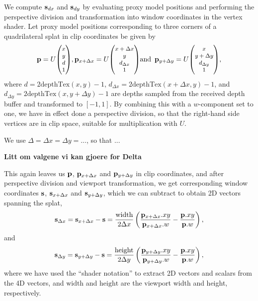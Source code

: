 We compute $\mathbf{s}_{dx}$ and $\mathbf{s}_{dy}$ by evaluating proxy model positions and
performing the perspective division and transformation into window coordinates
in the vertex shader. Let proxy model positions corresponding to three corners
of a quadrilateral splat in clip coordinates be
given by
\[
  \pv =
  U { \small \begin{pmatrix} x \\ y \\ d \\ 1 \end{pmatrix} },
  \pv_{x+\Delta x} =
  U { \small \begin{pmatrix} x+\Delta x \\ y \\ d_{\Delta x} \\ 1 \end{pmatrix} }
  \text{and}\, \, \, 
  \pv_{y+\Delta y} =
  U { \small \begin{pmatrix} x \\ y+\Delta y \\ d_{\Delta y} \\ 1 \end{pmatrix} },
\]
where $d = 2\text{depthTex}(x, y) - 1$, $d_{\Delta x} =
2\text{depthTex}(x+\Delta x, y) - 1$, and $d_{\Delta y} = 2\text{depthTex}(x,
y+\Delta y) - 1$ are depths sampled from the received depth buffer and
transformed to $[-1, 1]$. By combining this with a $w$-component set to one, we
have in effect done a perspective division, so that the right-hand side vertices
are in clip space, suitable for multiplication with $U$.

We use $\Delta = \Delta x = \Delta y = ...$, so that ...

\textbf{ Litt om valgene vi kan gjoere for Delta}

This again leaves us $\mathbf{p}$, $\mathbf{p}_{x+\Delta x}$ and $\mathbf{p}_{y+\Delta y}$ in clip
coordinates, and after perspective division and viewport transformation, we get
corresponding window coordinates $\mathbf{s}$, $\mathbf{s}_{x+\Delta x}$ and $\mathbf{s}_{y+\Delta
y}$, which we can subtract to obtain 2D vectors spanning the splat,
\[
  \mathbf{s}_{\Delta x} =
  \mathbf{s}_{x+\Delta x} - \mathbf{s} =
    \frac{\text{width}}{2\Delta x} \left(
        \frac{\mathbf{p}_{x+\Delta x}.xy}{\mathbf{p}_{x+\Delta x}.w} -
        \frac{\mathbf{p}.xy}{\mathbf{p}.w}
    \right),
\]
and
\[
  \mathbf{s}_{\Delta y} =
  \mathbf{s}_{y+\Delta y} - \mathbf{s} =
    \frac{\text{height}}{2\Delta y} \left(
        \frac{\mathbf{p}_{y+\Delta y}.xy}{\mathbf{p}_{y+\Delta y}.w} -
        \frac{\mathbf{p}.xy}{\mathbf{p}.w}
    \right),
\]
where we have used the ``shader notation'' to extract 2D vectors and scalars
from the 4D vectors, and $\text{width}$ and $\text{height}$ are the viewport
width and height, respectively.


